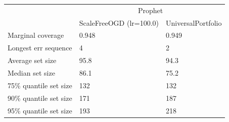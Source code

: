 \begin{tabular}{lll}
\toprule
& \multicolumn{2}{c}{Prophet} \\
& ScaleFreeOGD (lr=100.0) & UniversalPortfolio \\
\midrule
Marginal coverage & 0.948 & 0.949 \\
Longest err sequence & 4 & 2 \\
Average set size & 95.8 & 94.3 \\
Median set size & 86.1 & 75.2 \\
75\% quantile set size & 132 & 132 \\
90\% quantile set size & 171 & 187 \\
95\% quantile set size & 193 & 218 \\
\bottomrule
\end{tabular}

